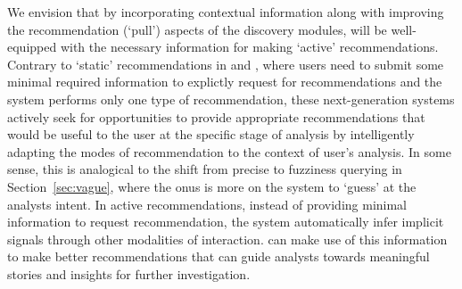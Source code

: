 \par We envision that by incorporating contextual information along with improving the recommendation (`pull') aspects of the \vidaql discovery modules, \vida will be well-equipped with the necessary information for making `active' recommendations. Contrary to `static' recommendations in \sbd and \seedb, where users need to submit some minimal required information to explictly request for recommendations and the system performs only one type of recommendation, these next-generation systems actively seek for opportunities to provide appropriate recommendations that would be useful to the user at the specific stage of analysis by intelligently adapting the modes of recommendation to the context of user's analysis. In some sense, this is analogical to the shift from precise to fuzziness querying in Section~\ref{sec:vague}, where the onus is more on the system to `guess' at the analysts intent. In active recommendations, instead of providing minimal information to request recommendation, the system automatically infer implicit signals through other modalities of interaction. \vida can make use of this information to make better recommendations that can guide analysts towards meaningful stories and insights for further investigation.


